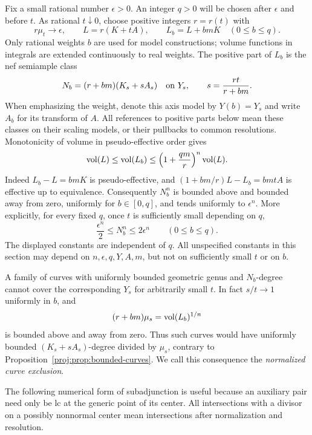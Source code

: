 Fix a small rational number \(\epsilon>0\).  An integer \(q>0\) will
be chosen after \(\epsilon\) and before \(t\).  As rational \(t\downarrow0\),
choose positive integers \(r=r(t)\) with
\begin{equation}\label{proj:jet:normalization}
 r\mu_t\longrightarrow\epsilon,\qquad
 L=r(K+tA),\qquad L_b=L+bmK\quad(0\le b\le q).
\end{equation}
Only rational weights \(b\) are used for model constructions;
volume functions in integrals are extended continuously to real weights.
The positive part of \(L_b\) is
the nef semiample class
\[
 N_b=(r+bm)(K_s+sA_s)
 \quad\hbox{on }Y_s,\qquad s=\frac{rt}{r+bm}.
\]
When emphasizing the weight, denote this axis model by \(Y(b)=Y_s\)
and write \(A_b\) for its transform of \(A\).
All references to positive parts below mean these classes on their
scaling models, or their pullbacks to common resolutions.  Monotonicity
of volume in pseudo-effective order gives
\begin{equation}\label{proj:jet:volume-comparison}
 \operatorname{vol}(L)\le \operatorname{vol}(L_b)\le
 \left(1+\frac{qm}{r}\right)^n\operatorname{vol}(L).
\end{equation}
Indeed \(L_b-L=bmK\) is pseudo-effective, and
\((1+bm/r)L-L_b=bmtA\) is effective up to equivalence.
Consequently \(N_b^n\) is bounded above and bounded away from zero,
uniformly for \(b\in[0,q]\), and tends uniformly to \(\epsilon^n\).
More explicitly, for every fixed \(q\), once \(t\) is sufficiently
small depending on \(q\),
\begin{equation}\label{proj:jet:uniform-normalized-volume}
 \frac{\epsilon^n}{2}\le N_b^n\le2\epsilon^n
 \qquad(0\le b\le q).
\end{equation}
The displayed constants are independent of \(q\).
All unspecified constants in this section may depend on
\(n,\epsilon,q,Y,A,m\), but not on sufficiently small \(t\) or on \(b\).

A family of curves with uniformly bounded geometric genus and
\(N_b\)-degree cannot cover the corresponding \(Y_s\) for arbitrarily
small \(t\).  In fact \(s/t\to1\) uniformly in \(b\), and
\[
 (r+bm)\mu_s=\operatorname{vol}(L_b)^{1/n}
\]
is bounded above and away from zero.  Thus such curves would have
uniformly bounded \((K_s+sA_s)\)-degree divided by \(\mu_s\), contrary
to Proposition~\ref{proj:prop:bounded-curves}.  We call this consequence the
\emph{normalized curve exclusion}.

The following numerical form of subadjunction is useful because an
auxiliary pair need only be lc at the generic point of its center.
All intersections with a divisor on a possibly nonnormal center mean
intersections after normalization and resolution.


